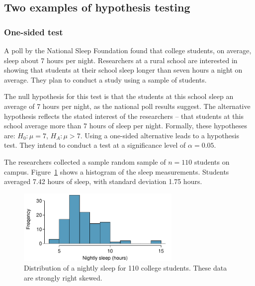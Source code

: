 \begin{spacing}{1.5}

\subsection{Two examples of hypothesis testing}
\label{hypothesisTestingExamples}


\subsubsection{One-sided test}

A poll by the National Sleep Foundation found that college students, on average, sleep about 7 hours per night. Researchers at a rural school are interested in showing that students at their school sleep longer than seven hours a night on average. They plan to conduct a study using a sample of students.

The null hypothesis for this test is that the students at this school sleep an average of 7 hours per night, as the national poll results suggest. The alternative hypothesis reflects the stated interest of the researchers -- that students at this school average more than 7 hours of sleep per night. Formally, these hypotheses are: $H_0: \mu = 7$, $H_A: \mu > 7$. Using a one-sided alternative leads to a  hypothesis test. They intend to conduct a test at a significance level of $\alpha = 0.05$.

The researchers collected a sample random sample of $n = 110$ students on campus. Figure~\ref{histOfSleepForCollegeThatWasCheckingForMoreThan7Hours} shows a histogram of the sleep measurements. Students averaged 7.42 hours of sleep, with standard deviation 1.75 hours. 

\begin{figure}[h]
	\centering
	\includegraphics[width=0.7\textwidth]{ch_inference_foundations_oi_biostat/figures/histOfSleepForCollegeThatWasCheckingForMoreThan7Hours/histOfSleepForCollegeThatWasCheckingForMoreThan7Hours}
	\caption{Distribution of a nightly sleep for 110 college students. These data are strongly right skewed.}
	\label{histOfSleepForCollegeThatWasCheckingForMoreThan7Hours}
\end{figure}


\end{spacing}
